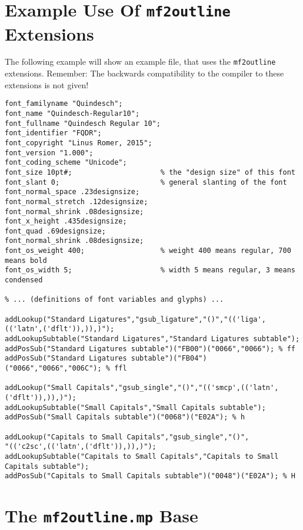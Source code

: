 \documentclass{scrartcl}
\begin{document}
\section{Example Use Of \texttt{mf2outline} Extensions}
%
The following example will show an example \MF{} file, that uses the \texttt{mf2outline} extensions. Remember: The backwards compatibility to the \MF{} compiler to these extensions is not given! 
\lstset{columns=fullflexible}
\begin{lstlisting}
font_familyname "Quindesch";
font_name "Quindesch-Regular10";
font_fullname "Quindesch Regular 10";
font_identifier "FQDR";
font_copyright "Linus Romer, 2015";
font_version "1.000";
font_coding_scheme "Unicode";
font_size 10pt#;                     % the "design size" of this font 
font_slant 0;                        % general slanting of the font   
font_normal_space .23designsize;
font_normal_stretch .12designsize;
font_normal_shrink .08designsize;
font_x_height .435designsize;
font_quad .69designsize;
font_normal_shrink .08designsize;
font_os_weight 400;                  % weight 400 means regular, 700 means bold
font_os_width 5;                     % width 5 means regular, 3 means condensed

% ... (definitions of font variables and glyphs) ...

addLookup("Standard Ligatures","gsub_ligature","()","(('liga',(('latn',('dflt')),)),)");
addLookupSubtable("Standard Ligatures","Standard Ligatures subtable");
addPosSub("Standard Ligatures subtable")("FB00")("0066","0066"); % ff
addPosSub("Standard Ligatures subtable")("FB04")("0066","0066","006C"); % ffl

addLookup("Small Capitals","gsub_single","()","(('smcp',(('latn',('dflt')),)),)");
addLookupSubtable("Small Capitals","Small Capitals subtable");
addPosSub("Small Capitals subtable")("0068")("E02A"); % h

addLookup("Capitals to Small Capitals","gsub_single","()",
"(('c2sc',(('latn',('dflt')),)),)");
addLookupSubtable("Capitals to Small Capitals","Capitals to Small Capitals subtable");
addPosSub("Capitals to Small Capitals subtable")("0048")("E02A"); % H
\end{lstlisting}
%
\section{The \texttt{mf2outline.mp} Base}
%
\end{document}
